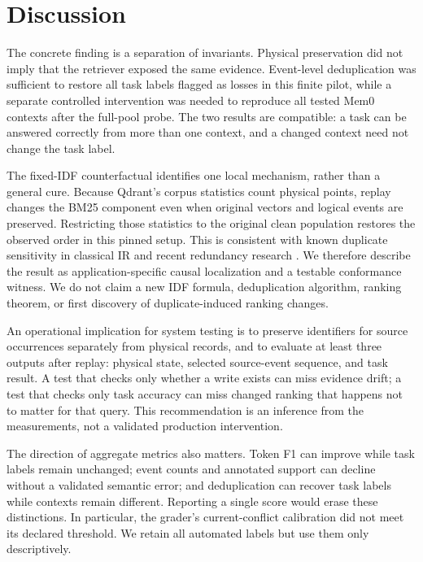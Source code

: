 \documentclass[10pt,letterpaper]{article}
\begin{document}
\section{Discussion}
The concrete finding is a separation of invariants. Physical preservation did not imply that the retriever exposed the same evidence. Event-level deduplication was sufficient to restore all task labels flagged as losses in this finite pilot, while a separate controlled intervention was needed to reproduce all tested Mem0 contexts after the full-pool probe. The two results are compatible: a task can be answered correctly from more than one context, and a changed context need not change the task label.

The fixed-IDF counterfactual identifies one local mechanism, rather than a general cure. Because Qdrant's corpus statistics count physical points, replay changes the BM25 component even when original vectors and logical events are preserved. Restricting those statistics to the original clean population restores the observed order in this pinned setup. This is consistent with known duplicate sensitivity in classical IR and recent redundancy research \citep{frieder2003scalable,robertson2009probabilistic,schelpe2026byte,jain2026cuer}. We therefore describe the result as application-specific causal localization and a testable conformance witness. We do not claim a new IDF formula, deduplication algorithm, ranking theorem, or first discovery of duplicate-induced ranking changes.

An operational implication for system testing is to preserve identifiers for source occurrences separately from physical records, and to evaluate at least three outputs after replay: physical state, selected source-event sequence, and task result. A test that checks only whether a write exists can miss evidence drift; a test that checks only task accuracy can miss changed ranking that happens not to matter for that query. This recommendation is an inference from the measurements, not a validated production intervention.

The direction of aggregate metrics also matters. Token F1 can improve while task labels remain unchanged; event counts and annotated support can decline without a validated semantic error; and deduplication can recover task labels while contexts remain different. Reporting a single score would erase these distinctions. In particular, the grader's current-conflict calibration did not meet its declared threshold. We retain all automated labels but use them only descriptively.
\end{document}
